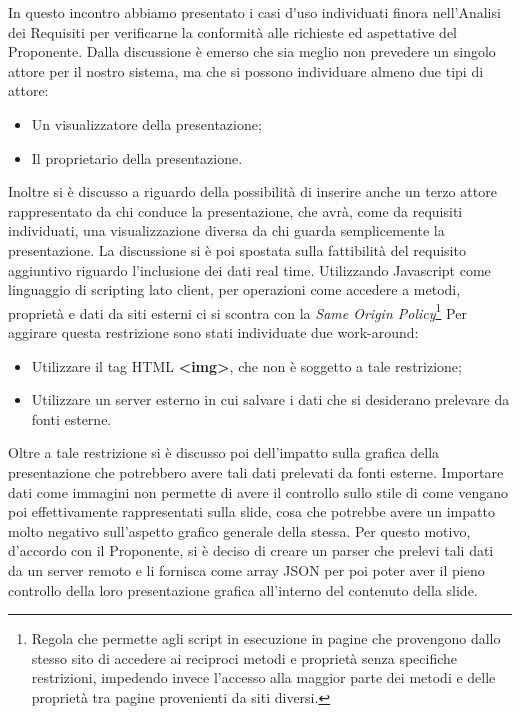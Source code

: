 In questo incontro abbiamo presentato i \gls{casi d'uso} individuati finora nell'Analisi dei Requisiti per verificarne la conformità alle richieste ed aspettative del Proponente.
\noindent Dalla discussione è emerso che sia meglio non prevedere un singolo attore per il nostro sistema, ma che si possono individuare almeno due tipi di attore:
\begin{itemize}
	\item Un visualizzatore della presentazione;
	\item Il proprietario della presentazione.
\end{itemize}
Inoltre si è discusso a riguardo della possibilità di inserire anche un terzo attore rappresentato da chi conduce la presentazione, che avrà, come da requisiti individuati, una visualizzazione diversa da chi guarda semplicemente la presentazione.
\noindent La discussione si è poi spostata sulla fattibilità del requisito aggiuntivo riguardo l'inclusione dei dati \gls{real time}. Utilizzando \gls{Javascript} come linguaggio di scripting lato client, per operazioni come accedere a metodi, proprietà e dati da siti esterni ci si scontra con la \textit{Same Origin Policy}\footnote{Regola che permette agli script in esecuzione in pagine che provengono dallo stesso sito di accedere ai reciproci metodi e proprietà senza specifiche restrizioni, impedendo invece l'accesso alla maggior parte dei metodi e delle proprietà tra pagine provenienti da siti diversi.}
Per aggirare questa restrizione sono stati individuate due work-around:
\begin{itemize}
	\item Utilizzare il tag HTML \textbf{<img>}, che non è soggetto a tale restrizione;
	\item Utilizzare un server esterno in cui salvare i dati che si desiderano prelevare da fonti esterne.
\end{itemize}   
Oltre a tale restrizione si è discusso poi dell'impatto sulla grafica della presentazione che potrebbero avere tali dati prelevati da fonti esterne. Importare dati come immagini non permette di avere il controllo sullo stile di come vengano poi effettivamente rappresentati sulla slide, cosa che potrebbe avere un impatto molto negativo sull'aspetto grafico generale della stessa. Per questo motivo, d'accordo con il Proponente, si è deciso di creare un \gls{parser} che prelevi tali dati da un server remoto e li fornisca come array \gls{JSON} per poi poter aver il pieno controllo della loro presentazione grafica all'interno del contenuto della slide.

